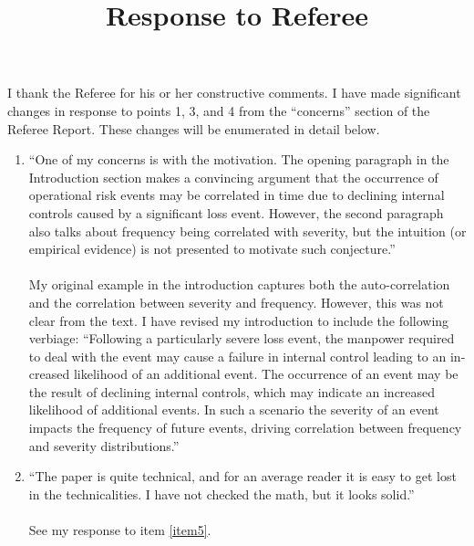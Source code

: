 \documentclass{article}
\theoremstyle{definition}
\begin{document}
\title{Response to Referee}
\date{}
\maketitle
I thank the Referee for his or her constructive comments.  I have made significant changes in response to points 1, 3, and 4 from the ``concerns'' section of the Referee Report.  These changes will be enumerated in detail below.

\begin{enumerate}
\item ``One of my concerns is with the motivation. The opening paragraph in the Introduction section makes a convincing argument that the occurrence of operational risk events may be correlated in time due to declining internal controls caused by a significant loss event. However, the second paragraph also talks about frequency being correlated with severity, but the intuition (or empirical evidence) is not presented to motivate such conjecture.''
\\
\\
My original example in the introduction captures both the auto-correlation and the correlation between severity and frequency.  However, this was not clear from the text.  I have revised my introduction to include the following verbiage: ``Following a particularly severe loss event, the manpower required to deal with the event may cause a failure in internal control leading to an in-creased likelihood of an additional event.  The occurrence of an event may be the result of declining internal controls, which may indicate an increased likelihood of  additional  events.   In  such  a  scenario  the  severity  of  an  event  impacts  the frequency of future events, driving correlation between frequency and severity distributions.''
\item ``The paper is quite technical, and for an average reader it is easy to get lost in the technicalities. I have not checked the math, but it looks solid.''
\\
\\
See my response to item \ref{item5}.


\end{enumerate}
\end{document}
